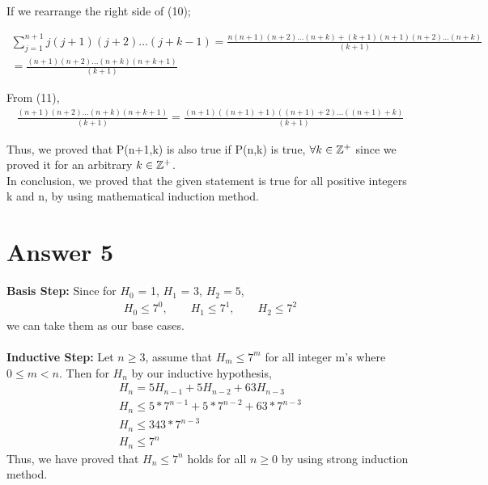 \documentclass[12pt]{article}
\newcommand{\Z}{\mathbb{Z}}
\begin{document}
If we rearrange the right side of (10);

\begin{equation}
\begin{split}
\sum_{j=1}^{n+1}j(j+1)(j+2)...(j+k-1)  = \frac{n(n+1)(n+2)...(n+k) + (k+1)(n+1)(n+2) ...(n+k)}{(k+1)} & \\ = \frac{(n+1)(n+2)...(n+k)(n+k+1)}{(k+1)}
\end{split}
\end{equation}

From (11),
\begin{equation}
\begin{split}
 \frac{(n+1)(n+2)...(n+k)(n+k+1)}{(k+1)} = \frac{(n+1)((n+1)+1)((n+1)+2)...((n+1)+k)}{(k+1)}
\end{split}
\end{equation}

Thus, we proved that P(n+1,k) is also true if P(n,k) is true,  $\forall k\in \Z\textsuperscript{+}$ since we proved it for an arbitrary $k \in \Z\textsuperscript{+}$.\\

In conclusion, we proved that the given statement is true for all positive integers k and n, by using mathematical induction method.

\section*{Answer 5}

\textbf{Basis Step:} Since for $H_{0}$ = 1, $H_{1}$ = 3, $H_{2} = 5$,
\begin{equation*}
\begin{split}
H_{0} \leq 7^{0}, \qquad H_{1} \leq 7^{1}, \qquad H_{2} \leq 7^{2}
\end{split}
\end{equation*}
we can take them as our base cases.\\ \\
\textbf{Inductive Step:} Let $n \geq 3$, assume that $H_{m} \leq 7^{m}$ for all integer m's where $0 \leq m < n$. Then for $H_{n}$ by our inductive 
hypothesis,
\begin{equation*}
\begin{split}
H_{n} = 5H_{n-1} + 5H_{n-2} + 63H_{n-3} \\
H_{n} \leq 5*7^{n-1} + 5*7^{n-2} + 63*7^{n-3}\\
H_{n} \leq 343*7^{n-3}\\
H_{n} \leq 7^{n}
\end{split}
\end{equation*}
Thus, we have proved that $H_{n} \leq 7^{n}$ holds for all $n \geq 0$ by using strong induction method.
\end{document}
